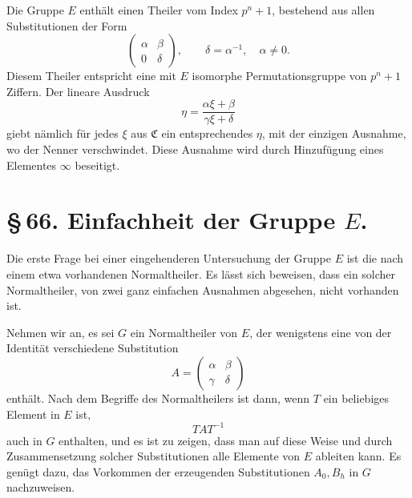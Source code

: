\documentclass[11pt]{article}
\begin{document}
Die Gruppe $E$ enthält einen Theiler vom Index $p^n+1$, bestehend aus allen Substitutionen der Form
\[
 \begin{pmatrix}\alpha&\beta\\0&\delta\end{pmatrix},\qquad \delta=\alpha^{-1},\quad \alpha\ne0.
\]
Diesem Theiler entspricht eine mit $E$ isomorphe Permutationsgruppe von $p^n+1$ Ziffern. Der lineare Ausdruck
\begin{equation}
 \eta=\frac{\alpha\xi+\beta}{\gamma\xi+\delta} \tag{12}
\end{equation}
giebt nämlich für jedes $\xi$ aus $\mathfrak C$ ein entsprechendes $\eta$, mit der einzigen Ausnahme, wo der Nenner verschwindet. Diese Ausnahme wird durch Hinzufügung eines Elementes $\infty$ beseitigt.

\section*{\S\,66. Einfachheit der Gruppe $E$.}

Die erste Frage bei einer eingehenderen Untersuchung der Gruppe $E$ ist die nach einem etwa vorhandenen Normaltheiler. Es lässt sich beweisen, dass ein solcher Normaltheiler, von zwei ganz einfachen Ausnahmen abgesehen, nicht vorhanden ist.

Nehmen wir an, es sei $G$ ein Normaltheiler von $E$, der wenigstens eine von der Identität verschiedene Substitution
\begin{equation}
 A=\begin{pmatrix}\alpha&\beta\\\gamma&\delta\end{pmatrix} \tag{1}
\end{equation}
enthält. Nach dem Begriffe des Normaltheilers ist dann, wenn $T$ ein beliebiges Element in $E$ ist,
\begin{equation}
 TAT^{-1} \tag{2}
\end{equation}
auch in $G$ enthalten, und es ist zu zeigen, dass man auf diese Weise und durch Zusammensetzung solcher Substitutionen alle Elemente von $E$ ableiten kann. Es genügt dazu, das Vorkommen der erzeugenden Substitutionen $A_0,B_h$ in $G$ nachzuweisen.
\end{document}
